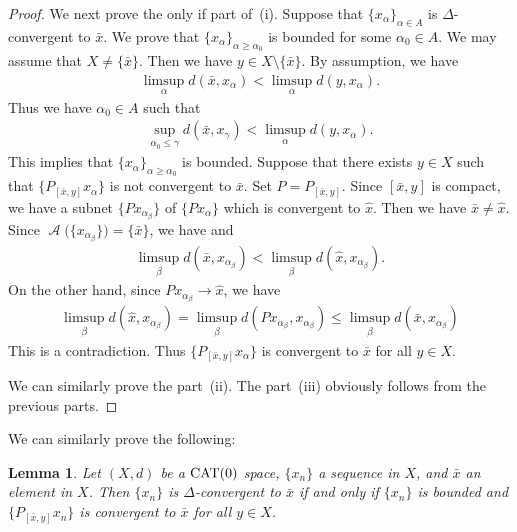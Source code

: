 \documentclass[draft]{amsart}
\numberwithin{equation}{section}
\DeclareMathOperator{\AC}{\mathcal{A}}
\newcommand{\CAT}{\textup{CAT}}
\theoremstyle{plain}
\newtheorem{lemma}[theorem]{Lemma}
\theoremstyle{definition}
\theoremstyle{remark}
\begin{document}
\begin{proof}
 We next prove the only if part of~(i).  
 Suppose that 
 $\{x_{\alpha}\}_{\alpha\in A}$ is $\Delta$-convergent to $\bar{x}$. 
 We prove that $\{x_{\alpha}\}_{\alpha\geq \alpha_0}$ 
 is bounded for some $\alpha_0 \in A$. 
 We may assume that $X\neq \{\bar{x}\}$. 
 Then we have $y\in X\setminus \{\bar{x}\}$. 
 By assumption, we have 
 \begin{align}
  \limsup_{\alpha}d(\bar{x},x_{\alpha}) < 
\limsup_{\alpha}d(y,x_{\alpha}). 
 \end{align}
 Thus we have $\alpha_0\in A$ such that 
 \begin{align}
  \sup_{\alpha_0\leq \gamma} d(\bar{x},x_{\gamma}) 
 < \limsup_{\alpha}d(y,x_{\alpha}). 
 \end{align}
 This implies that $\{x_{\alpha}\}_{\alpha\geq \alpha_0}$ is bounded. 
 Suppose that 
 there exists $y\in X$ such that 
 $\{P_{[\bar{x},y]}x_{\alpha}\}$ is not convergent to $\bar{x}$. 
 Set $P=P_{[\bar{x},y]}$. Since $[\bar{x},y]$ is compact, 
 we have a subnet $\{Px_{\alpha_{\beta}}\}$ of $\{Px_{\alpha}\}$ 
 which is convergent to $\hat{x}$. Then we have $\bar{x}\neq \hat{x}$. 
 Since $\AC\bigl(\{x_{\alpha_{\beta}}\}\bigr)=\{\bar{x}\}$, we have  
 and 
 \begin{align}
  \limsup_{\beta} d(\bar{x},x_{\alpha_{\beta}})
  < \limsup_{\beta} d(\hat{x},x_{\alpha_{\beta}}). 
 \end{align}
 On the other hand, since $Px_{\alpha_{\beta}}\to \hat{x}$, we have 
 \begin{align}
  \limsup_{\beta} d(\hat{x},x_{\alpha_{\beta}}) 
  =\limsup_{\beta} d(Px_{\alpha_{\beta}},x_{\alpha_{\beta}}) 
  \leq \limsup_{\beta} d(\bar{x},x_{\alpha_{\beta}}) 
 \end{align}
 This is a contradiction. Thus 
 $\{P_{[\bar{x},y]}x_{\alpha}\}$ is convergent to $\bar{x}$ 
 for all $y\in X$. 

 We can similarly prove the part~(ii). 
 The part~(iii) obviously follows from the previous parts. 
\end{proof}

We can similarly prove the following: 

\begin{lemma}\label{lem:Delta-sequence}
 Let $(X,d)$ be a $\CAT(0)$ space, $\{x_n\}$ a sequence in $X$, 
 and $\bar{x}$ an element in $X$. 
 Then $\{x_n\}$ is $\Delta$-convergent to $\bar{x}$ 
 if and only if $\{x_n\}$ is bounded and 
 $\{P_{[\bar{x},y]}x_n\}$ is convergent to $\bar{x}$ 
 for all $y\in X$. 
\end{lemma}
\end{document}
